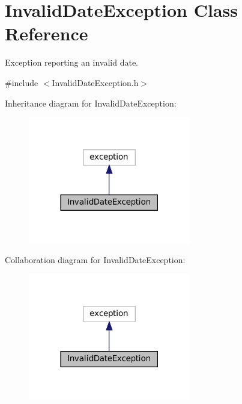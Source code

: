 \hypertarget{classInvalidDateException}{}\section{Invalid\+Date\+Exception Class Reference}
\label{classInvalidDateException}


Exception reporting an invalid date.  




{\ttfamily \#include $<$Invalid\+Date\+Exception.\+h$>$}



Inheritance diagram for Invalid\+Date\+Exception\+:
\nopagebreak
\begin{figure}[H]
\begin{center}
\leavevmode
\includegraphics[width=201pt]{classInvalidDateException__inherit__graph}
\end{center}
\end{figure}


Collaboration diagram for Invalid\+Date\+Exception\+:
\nopagebreak
\begin{figure}[H]
\begin{center}
\leavevmode
\includegraphics[width=201pt]{classInvalidDateException__coll__graph}
\end{center}
\end{figure}
